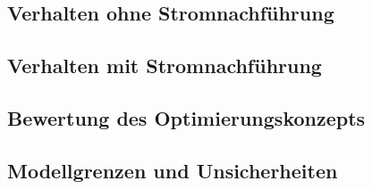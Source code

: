 \subsection{Verhalten ohne Stromnachführung}
\label{sec:verhalten_ohne_stromnachfuehrung}



\subsection{Verhalten mit Stromnachführung}
\label{sec:verhalten_mit_stromnachfuehrung}



\subsection{Bewertung des Optimierungskonzepts}
\label{sec:bewertung_optimierungskonzept}

%


\subsection{Modellgrenzen und Unsicherheiten}
\label{sec:modellgrenzen_unsicherheiten}

